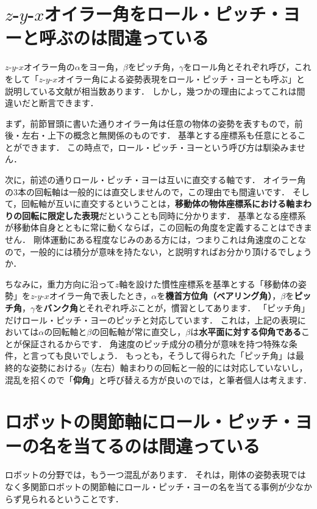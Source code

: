 ﻿\documentclass[a4paper]{jsarticle}
\begin{document}
\section{$z$-$y$-$x$オイラー角をロール・ピッチ・ヨーと呼ぶのは間違っている}

$z$-$y$-$x$オイラー角の$\alpha$をヨー角，$\beta$をピッチ角，$\gamma$をロール角とそれぞれ呼び，これをして「$z$-$y$-$x$オイラー角による姿勢表現をロール・ピッチ・ヨーとも呼ぶ」と説明している文献が相当数あります．
しかし，幾つかの理由によってこれは間違いだと断言できます．

まず，前節冒頭に書いた通りオイラー角は任意の物体の姿勢を表すもので，前後・左右・上下の概念と無関係のものです．
基準とする座標系も任意にとることができます．
この時点で，ロール・ピッチ・ヨーという呼び方は馴染みません．

次に，前述の通りロール・ピッチ・ヨーは互いに直交する軸です．
オイラー角の3本の回転軸は一般的には直交しませんので，この理由でも間違いです．
そして，回転軸が互いに直交するということは，{\bf 移動体の物体座標系における軸まわりの回転に限定した表現}だということも同時に分かります．
基準となる座標系が移動体自身とともに常に動くならば，この回転の角度を定義することはできません．
剛体運動にある程度なじみのある方には，つまりこれは角速度のことなので，一般的には積分が意味を持たない，と説明すればお分かり頂けるでしょうか．

ちなみに，重力方向に沿って$z$軸を設けた慣性座標系を基準とする「移動体の姿勢」を$z$-$y$-$x$オイラー角で表したとき，$\alpha$を{\bf 機首方位角（ベアリング角）}，$\beta$を{\bf ピッチ角}，$\gamma$を{\bf バンク角}とそれぞれ呼ぶことが，慣習としてあります．
「ピッチ角」だけロール・ピッチ・ヨーのピッチと対応しています．
これは，上記の表現においては$\alpha$の回転軸と$\beta$の回転軸が常に直交し，$\beta$は{\bf 水平面に対する仰角である}ことが保証されるからです．
角速度のピッチ成分の積分が意味を持つ特殊な条件，と言っても良いでしょう．
もっとも，そうして得られた「ピッチ角」は最終的な姿勢における$y$（左右）軸まわりの回転と一般的には対応していないし，混乱を招くので「{\bf 仰角}」と呼び替える方が良いのでは，と筆者個人は考えます．




\section{ロボットの関節軸にロール・ピッチ・ヨーの名を当てるのは間違っている}

ロボットの分野では，もう一つ混乱があります．
それは，剛体の姿勢表現ではなく多関節ロボットの関節軸にロール・ピッチ・ヨーの名を当てる事例が少なからず見られるということです．
\end{document}
